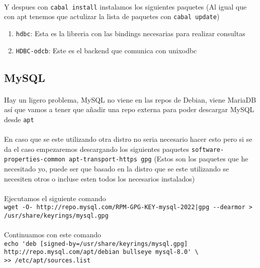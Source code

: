 \documentclass{article}
\begin{document}
		\paragraph{} Y despues con \verb+cabal install+ instalamos los siguientes paquetes (Al igual que con apt tenemos que actulizar la lista de paquetes con \verb+cabal update+)
		\begin{enumerate}
			\item \verb+hdbc+: Esta es la libreria con las bindings necesarias para realizar consultas
			\item \verb+HDBC-odcb+: Este es el backend que comunica con unixodbc
		\end{enumerate}
		\subsection{MySQL}
			\paragraph{} Hay un ligero problema, MySQL no viene en las repos de Debian, viene MariaDB así que vamos a tener que añadir una repo externa para poder descargar MySQL desde \verb+apt+

			\paragraph{} En caso que se este utilizando otra distro no seria necesario hacer esto pero si se da el caso empezaremos descargando los siguientes paquetes \verb+software-properties-common apt-transport-https gpg+ (Estos son los paquetes que he necesitado yo, puede ser que basado en la distro que se este utilizando se necesiten otros o incluse esten todos los necesarios instalados)
			
			\paragraph{} Ejecutamos el siguiente comando \\{\small\verb+wget -O- http://repo.mysql.com/RPM-GPG-KEY-mysql-2022|gpg --dearmor > /usr/share/keyrings/mysql.gpg+}
			
			\paragraph{} Continuamos con este comando \\{\small\verb+echo 'deb [signed-by=/usr/share/keyrings/mysql.gpg] http://repo.mysql.com/apt/debian bullseye mysql-8.0' \+\\\verb+>> /etc/apt/sources.list+}
\end{document}
